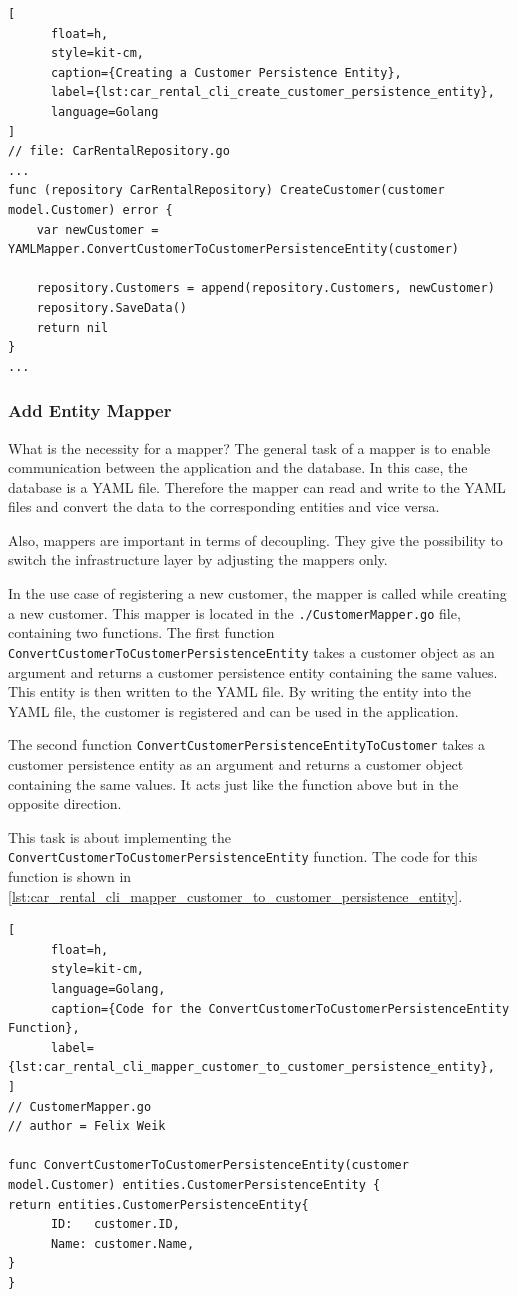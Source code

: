\begin{lstlisting}[
      float=h,
      style=kit-cm,
      caption={Creating a Customer Persistence Entity},
      label={lst:car_rental_cli_create_customer_persistence_entity},
      language=Golang
]
// file: CarRentalRepository.go
...
func (repository CarRentalRepository) CreateCustomer(customer model.Customer) error {
	var newCustomer = YAMLMapper.ConvertCustomerToCustomerPersistenceEntity(customer)

	repository.Customers = append(repository.Customers, newCustomer)
	repository.SaveData()
	return nil
}
...
\end{lstlisting}

\subsubsection*{Add Entity Mapper}
What is the necessity for a mapper?
The general task of a mapper is to enable communication between the application and the database.
In this case, the database is a YAML file.
Therefore the mapper can read and write to the YAML files and convert the data to the corresponding entities and vice versa.

Also, mappers are important in terms of decoupling.
They give the possibility to switch the infrastructure layer by adjusting the mappers only.

In the use case of registering a new customer, the mapper is called while creating a new customer.
This mapper is located in the \texttt{./CustomerMapper.go} file, containing two functions.
The first function \texttt{ConvertCustomerToCustomerPersistenceEntity} takes a customer object as an argument and returns a customer persistence entity containing the same values.
This entity is then written to the YAML file.
By writing the entity into the YAML file, the customer is registered and can be used in the application.

The second function \texttt{ConvertCustomerPersistenceEntityToCustomer} takes a customer persistence entity as an argument and returns a customer object containing the same values.
It acts just like the function above but in the opposite direction.

This task is about implementing the \texttt{ConvertCustomerToCustomerPersistenceEntity} function.
The code for this function is shown in \autoref{lst:car_rental_cli_mapper_customer_to_customer_persistence_entity}.

\begin{lstlisting}[
      float=h,
      style=kit-cm,
      language=Golang,
      caption={Code for the ConvertCustomerToCustomerPersistenceEntity Function},
      label={lst:car_rental_cli_mapper_customer_to_customer_persistence_entity},
]
// CustomerMapper.go
// author = Felix Weik

func ConvertCustomerToCustomerPersistenceEntity(customer model.Customer) entities.CustomerPersistenceEntity {
return entities.CustomerPersistenceEntity{
      ID:   customer.ID,
      Name: customer.Name,
}
}
\end{lstlisting}

